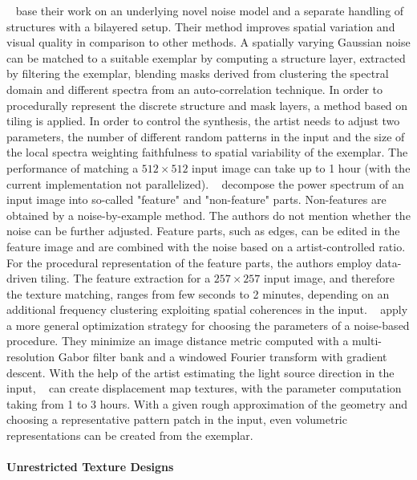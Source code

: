  \citeauthor*{guingo_2017_btm}~\cite{guingo_2017_btm} base their work on an underlying novel noise model and a separate handling of structures with a bilayered setup. Their method improves spatial variation and visual quality in comparison to other methods. A spatially varying Gaussian noise can be matched to a suitable exemplar by computing a structure layer, extracted by filtering the exemplar, blending masks derived from clustering the spectral domain and different spectra from an auto-correlation technique. In order to procedurally represent the discrete structure and mask layers, a method based on tiling is applied. In order to control the synthesis, the artist needs to adjust two parameters, the number of different random patterns in the input and the size of the local spectra weighting faithfulness to spatial variability of the exemplar. The performance of matching a $512\times512$ input image can take up to 1 hour (with the current implementation not parallelized).
 \citeauthor*{kang_2017_fpt}~\cite{kang_2017_fpt} decompose the power spectrum of an input image into so-called "feature" and "non-feature" parts. Non-features are obtained by a noise-by-example method. The authors do not mention whether the noise can be further adjusted. Feature parts, such as edges, can be edited in the feature image and are combined with the noise based on a artist-controlled ratio. For the procedural representation of the feature parts, the authors employ data-driven tiling. The feature extraction for a $257\times257$ input image, and therefore the texture matching, ranges from few seconds to 2 minutes, depending on an additional frequency clustering exploiting spatial coherences in the input.
 \citeauthor*{gilet_2010_ias}~\cite{gilet_2010_ias} apply a more general optimization strategy for choosing the parameters of a noise-based procedure. They minimize an image distance metric computed with a multi-resolution Gabor filter bank and a windowed Fourier transform with gradient descent. With the help of the artist estimating the light source direction in the input, \citeauthor*{gilet_2010_ias}~\cite{gilet_2010_ias} can create displacement map textures, with the parameter computation taking from 1 to 3 hours. With a given rough approximation of the geometry and choosing a representative pattern patch in the input, even volumetric representations can be created from the exemplar.



\paragraph{Unrestricted Texture Designs}
\label{para:analysis_example_based_unristricted}

